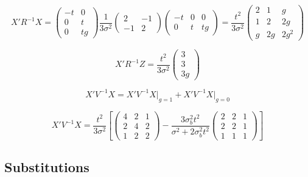 \documentclass[11pt]{article}
\begin{document}
\begin{equation}
  X'R^{-1}X
  = \begin{pmatrix} -t & 0 \\ 0 & t \\ 0 & tg
    \end{pmatrix}
    \frac{1}{3\sigma^2}
    \begin{pmatrix} 2 & -1 \\ -1 & 2 \end{pmatrix}
    \begin{pmatrix} -t & 0 & 0 \\ 0 & t & tg \end{pmatrix}
  = \frac{t^2}{3\sigma^2}
    \begin{pmatrix}
      2 & 1 & g \\ 1 & 2 & 2g \\ g & 2g & 2g^2
    \end{pmatrix}
\end{equation}

\begin{equation}
  X'R^{-1}Z
  = \frac{t^2}{3\sigma^2}
    \begin{pmatrix} 3 \\ 3 \\ 3g \end{pmatrix}
\end{equation}

\begin{equation}
  X'V^{-1}X = X'V^{-1}X\big|_{g=1}
    + X'V^{-1}X\big|_{g=0}
\end{equation}

\begin{equation}
  X'V^{-1}X
  = \frac{t^2}{3\sigma^2}\!\left[
    \begin{pmatrix}
      4 & 2 & 1 \\ 2 & 4 & 2 \\ 1 & 2 & 2
    \end{pmatrix}
    - \frac{3\sigma_b^2 t^2}
      {\sigma^2 + 2\sigma_b^2 t^2}
    \begin{pmatrix}
      2 & 2 & 1 \\ 2 & 2 & 1 \\ 1 & 1 & 1
    \end{pmatrix}
  \right]
\end{equation}

\subsection*{Substitutions}
\end{document}
